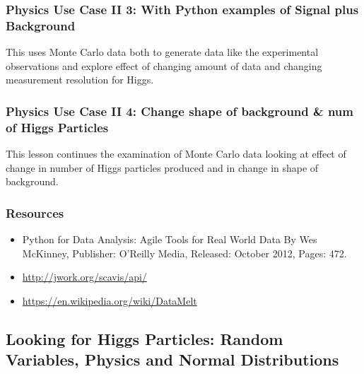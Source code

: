 
\subsubsection{Physics Use Case II 3: With Python examples of Signal
plus
Background}\label{physics-use-case-ii-3-with-python-examples-of-signal-plus-background}

This uses Monte Carlo data both to generate data like the experimental
observations and explore effect of changing amount of data and changing
measurement resolution for Higgs.


\subsubsection{Physics Use Case II 4: Change shape of background \& num
of Higgs
Particles}\label{physics-use-case-ii-4-change-shape-of-background-num-of-higgs-particles}

This lesson continues the examination of Monte Carlo data looking at
effect of change in number of Higgs particles produced and in change in
shape of background.


\subsubsection{Resources}\label{resources-1}

\begin{itemize}
\tightlist
\item
  Python for Data Analysis: Agile Tools for Real World Data By Wes
  McKinney, Publisher: O'Reilly Media, Released: October 2012, Pages:
  472.
\item
  \url{http://jwork.org/scavis/api/}
\item
  \url{https://en.wikipedia.org/wiki/DataMelt}
\end{itemize}

\subsection{Looking for Higgs Particles: Random Variables, Physics and
Normal
Distributions}\label{looking-for-higgs-particles-random-variables-physics-and-normal-distributions}

